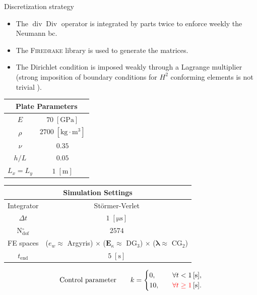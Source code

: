 \documentclass[aspectratio=169]{ISAE-Beamer}
\DeclareMathOperator*{\Div}{Div}
\renewcommand{\div}{\operatorname{div}}
\newcommand{\firedrake}{\textsc{Firedrake}\xspace}
\begin{document}
\begin{frame}{Discretization strategy}
\begin{itemize}
\item The $\div\Div$ operator is integrated by parts twice to enforce weekly the Neumann bc.
\item The \firedrake library is used to generate the matrices.
\item The Dirichlet condition is imposed weakly through a Lagrange multiplier (strong imposition of boundary conditions for $H^2$ conforming elements is not trivial ).
\end{itemize} 

\begin{table}[t]
	\centering
	\begin{tabular}{|c|c|}
		\hline 
		\multicolumn{2}{|c|}{Plate Parameters} \\ 
		\hline 
		$E$ & $70\; \mathrm{[GPa]}$ \\ 
		$\rho$ & $2700\; \mathrm{[kg \cdot m^3]}$ \\ 
		$\nu$& $0.35$ \\ 
		$h/L$& $0.05$ \\ 
		$L_x = L_y$& $1\; \mathrm{[m]}$\\ 
		\hline 
	\end{tabular} \hspace{.1cm}
	\begin{tabular}{|c|c|}
		\hline 
		\multicolumn{2}{|c|}{Simulation Settings} \\
		\hline 
		Integrator & St\"ormer-Verlet \\
		$\Delta t $ & $1 \; \mathrm{[\mu s]}$ \\  
		N$_{\text{dof}}^\circ$ & $2574$ \\
		FE spaces & ($e_w \approx $ Argyris) $\times$ ($\bm{E}_\kappa \approx$ DG$_3$) $\times$ ($\bm{\lambda} \approx$ CG$_2$)\\
		$t_{\text{end}}$ & $5\; \mathrm{[s]}$\\ 
		\hline 
	\end{tabular} 
\end{table}

\begin{equation*}
	\text{Control parameter} \qquad 
	k = 
	\begin{cases}
	0, \quad &\forall t < 1 \, [\mathrm{s}], \\
	10, \quad & \textcolor{red}{\forall t \ge 1} \, [\mathrm{s}].
	\end{cases}
\end{equation*}

	
\end{frame}
\end{document}

